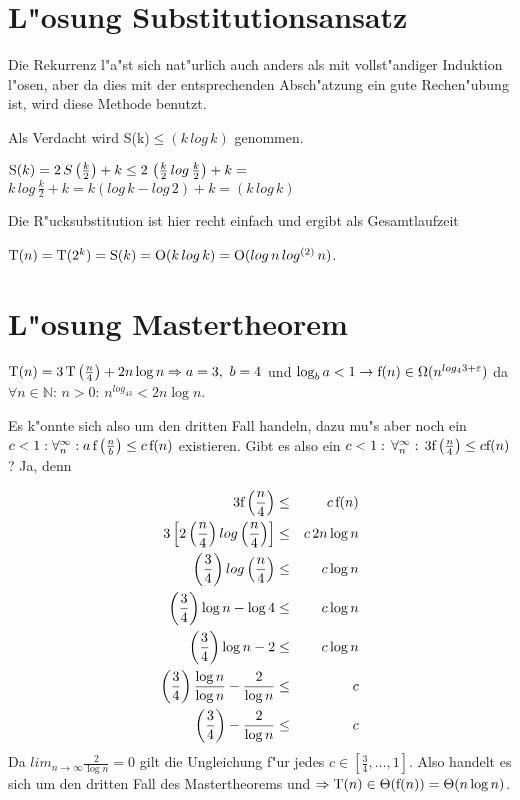 \documentclass[draft,12pt]{scrreprt}
\theoremstyle{break}
\begin{document}
\section{L"osung Substitutionsansatz}
\label{lsg_substitutionsansatz}

Die Rekurrenz l"a"st sich nat"urlich auch anders als mit vollst"andiger Induktion l"osen, aber da dies mit der entsprechenden Absch"atzung ein
gute Rechen"ubung ist, wird diese Methode benutzt.

Als Verdacht wird S(k)$\leq(k\, log\,k)$ genommen.

\noindent
\(\textup{S}(k) = 2\, S\left(\frac{k}{2}\right)+k\leq 2\, \left(\frac{k}{2}\, log\, \frac{k}{2}\right)+k=\)
\(k\, log\, \frac{k}{2}+k=k \left(log\, k-log\,2\right)+k=(k\, log\,k)\)

Die R"ucksubstitution ist hier recht einfach und ergibt als Gesamtlaufzeit

$\textup{T}(n)=\textup{T}(2^k)=\textup{S}(k)=\textup{O}(k\, log\,k)=\textup{O}(log\,n\, log^{(2)}\, n)$.

\section{L"osung Mastertheorem}
\label{mastertheorem_Fall3}

\( \textup{T}(n) = 3 \, \textup{T}\left(\frac{n}{4}\right) + 2n\log n \Rightarrow a=3,\ b=4\) und \(\log_ba<1 \rightarrow 
\textup{f}(n) \in \Omega(n^{log_43+\varepsilon})\) da \(\forall n \in \mathbb{N}:\,n>0:\,n^{log_43}<2n\log n\).

Es k"onnte sich also um den dritten Fall handeln, dazu mu"s aber noch ein \(c < 1 : \forall^{\infty}_{n}:
a \, \textup{f}\left(\frac{n}{b}\right)  \leq c \, \textup{f}(n)\) existieren. Gibt es also ein 
\(c<1:\, \forall^{\infty}_{n}:\, 3\textup{f}\left(\frac{n}{4}\right) \leq c\textup{f}(n)\)? Ja, denn

\begin{eqnarray*}
3\textup{f}\left(\frac{n}{4}\right) & \leq & c\,\textup{f}(n)\\
3\left[2\left(\frac{n}{4}\right) log \left(\frac{n}{4}\right)\right] & \leq & c\, 2n \log n\\
\left(\frac{3}{4}\right) log \left(\frac{n}{4}\right) & \leq & c \log n\\
\left(\frac{3}{4}\right) \log n- \log 4 & \leq & c \log n\\
\left(\frac{3}{4}\right) \log n- 2 & \leq & c \log n\\
\left(\frac{3}{4}\right) \frac{\log n}{\log n}-\frac{2}{\log n} & \leq & c\\
\left(\frac{3}{4}\right) -\frac{2}{\log n} & \leq & c
\end{eqnarray*}
Da \(lim_{n \to \infty} \frac{2}{\log n}=0\) gilt die Ungleichung f"ur jedes \(c \in [\frac{3}{4},\ldots,1]\). %
Also handelt es sich um den dritten Fall des Mastertheorems und 
\( \Rightarrow \textup{T}(n) \in \Theta (\textup{f}(n))=\Theta (n\log n)\).
\end{document}
